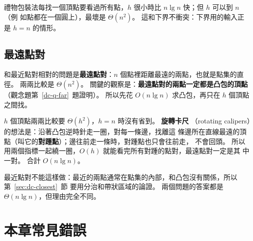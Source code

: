 禮物包裝法每找一個頂點要看過所有點，$h$ 很小時比 $n \lg n$ 快；但 $h$ 可以到 $n$（例
如點都在一個圓上），最壞是 $\Theta(n^2)$。 這和下界不衝突：下界用的輸入正是 $h = n$
的情形。

\subsection{最遠點對}
\label{sec:dc-farthest}

和最近點對相對的問題是\textbf{最遠點對}：$n$ 個點裡距離最遠的兩點，也就是點集的直徑。
兩兩比較是 $\Theta(n^2)$。 關鍵的觀察是：\textbf{最遠點對的兩點一定都是凸包的頂點}
（觀念題第~\ref{dc-q-far}~題證明）。 所以先花 $O(n \lg n)$ 求凸包，再只在 $h$ 個頂點
之間找。

$h$ 個頂點兩兩比較要 $\Theta(h^2)$，$h = n$ 時沒有省到。 \textbf{旋轉卡尺}
（rotating calipers）的想法是：沿著凸包逆時針走一圈，對每一條邊，找離這
條邊所在直線最遠的頂點（叫它的\textbf{對踵點}）；邊往前走一條時，對踵點也只會往前走，
不會回頭。 所以用兩個指標一起繞一圈，$O(h)$ 就能看完所有對踵的點對，最遠點對一定是其
中一對。 合計 $O(n \lg n)$。

最近點對不能這樣做：最近的兩點通常在點集的內部，和凸包沒有關係，所以第~\ref{sec:dc-closest}~節
要用分治和帶狀區域的論證。 兩個問題的答案都是 $\Theta(n \lg n)$，但理由完全不同。

\section{本章常見錯誤}
\label{sec:dc-pitfalls}

